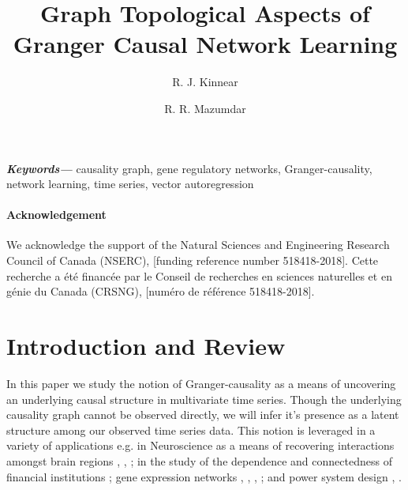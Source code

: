 \documentclass{statsoc}
\title{Graph Topological Aspects of Granger Causal Network Learning}
\author[Author 1 {\it et al.}]{R. J. Kinnear}
\author{R. R. Mazumdar}
\providecommand{\keywords}[1]{\textbf{\textit{Keywords---}} #1}
\begin{document}

\keywords{causality graph, gene regulatory networks,
  Granger-causality, network learning, time series, vector
  autoregression}

\paragraph{Acknowledgement}

We acknowledge the support of the Natural Sciences and Engineering Research Council of Canada (NSERC), [funding reference number 518418-2018].  Cette recherche a été financée par le Conseil de recherches en sciences naturelles et en génie du Canada (CRSNG), [numéro de référence 518418-2018].



\section{Introduction and Review}
\label{sec:introduction}
In this paper we study the notion of Granger-causality
\cite{granger1969investigating} \cite{Granger1980329} as a means of
uncovering an underlying causal structure in multivariate time series.
Though the underlying causality graph cannot be observed directly, we
will infer it's presence as a latent structure among our observed time
series data.  This notion is leveraged in a variety of applications
e.g. in Neuroscience as a means of recovering interactions amongst
brain regions \cite{bressler2011wiener}, \cite{anna_paper2008},
\cite{david2008identifying}; in the study of the dependence and
connectedness of financial institutions \cite{NBERw16223}; gene
expression networks \cite{Fujita2007},
\cite{methods_for_inferring_gene_regulatory_networks_from_time_series_expression_data},
\cite{grouped_graphical_granger_modelling_for_gene_expression_regulatory_networks_discovery},
\cite{discovering_graphical_Granger_causality_using_the_truncating_lasso_penalty};
and power system design \cite{Misyrlis2016450}, \cite{yuan2014root}.
\end{document}
